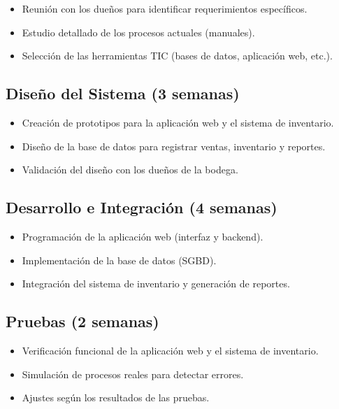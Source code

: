 \documentclass{article}
\begin{document}
  \begin{itemize}
    \item Reunión con los dueños para identificar requerimientos específicos.
    \item Estudio detallado de los procesos actuales (manuales).
    \item Selección de las herramientas TIC (bases de datos, aplicación web, etc.).
  \end{itemize}

\subsection{Diseño del Sistema (3 semanas)}
  
    \begin{itemize}
      \item Creación de prototipos para la aplicación web y el sistema de inventario.
      \item Diseño de la base de datos para registrar ventas, inventario y reportes.
      \item Validación del diseño con los dueños de la bodega.
    \end{itemize}

\subsection{Desarrollo e Integración (4 semanas)}

    \begin{itemize}
      \item Programación de la aplicación web (interfaz y backend).
      \item Implementación de la base de datos (SGBD).
      \item Integración del sistema de inventario y generación de reportes.
    \end{itemize}

\subsection{Pruebas (2 semanas)}

    \begin{itemize}
      \item Verificación funcional de la aplicación web y el sistema de inventario.
      \item Simulación de procesos reales para detectar errores.
      \item Ajustes según los resultados de las pruebas.
    \end{itemize}
\end{document}
